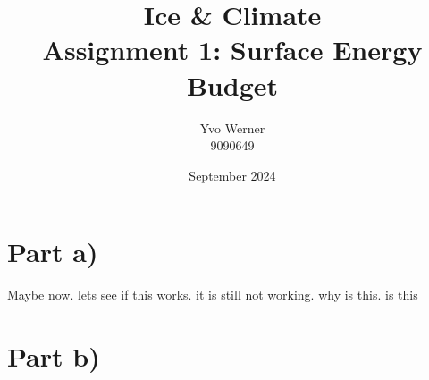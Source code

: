 \documentclass{article}
\title{Ice \& Climate \\ \vspace{1em} \large Assignment 1: Surface Energy Budget \normalsize}
\author{Yvo Werner\\ 9090649 }
\date{September 2024}
\begin{document}
\maketitle

\section*{Part a)}
Maybe now. lets see if this works. it is still not working. why is this. is this 



\section*{Part b)}







% 
\end{document}
